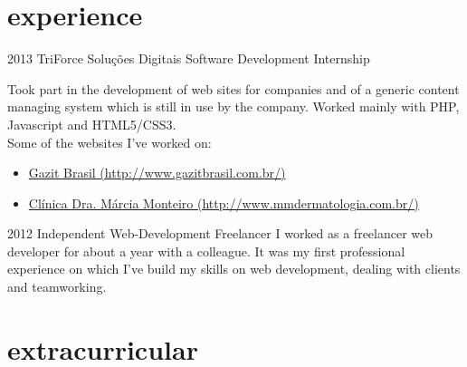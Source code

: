 \documentclass[]{friggeri-cv} %
\begin{document}

\section{experience}

\begin{entrylist}


\entry
{2013}
{TriForce Soluções Digitais}
{Software Development Internship}
{Took part in the development of web sites for companies and of a generic content managing system which is still in use by the company. Worked mainly with PHP, Javascript and HTML5/CSS3. \\
Some of the websites I've worked on:
\begin{itemize}
\item \href{http://www.gazitbrasil.com.br/}{Gazit Brasil (http://www.gazitbrasil.com.br/)}
\item \href{http://www.mmdermatologia.com.br/}{Clínica Dra. Márcia Monteiro (http://www.mmdermatologia.com.br/)}
\end{itemize}}

\entry
{2012}
{Independent Web-Development}
{Freelancer}
{I worked as a freelancer web developer for about a year with a colleague. It was my first professional experience on which I've build my skills on web development, dealing with clients and teamworking.}

\end{entrylist}


\section{extracurricular}
\end{document}
